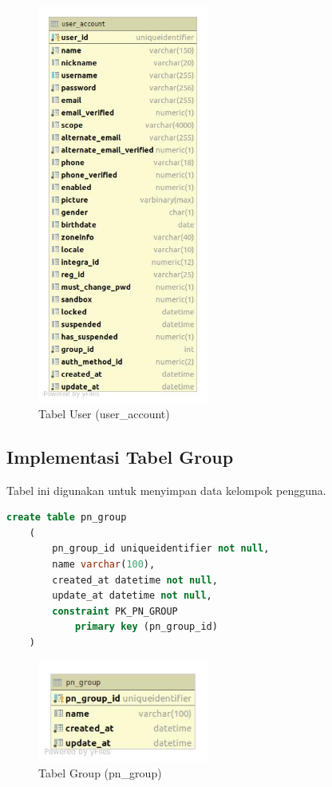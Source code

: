 \begin{figure}[H]
    \centering\includegraphics[width=0.5\textwidth]{bab4/figures/tabel_user_account.jpg}
    \caption{Tabel User (user\_account)}
    \label{tabel_user_account}
\end{figure}

\subsection{Implementasi Tabel Group}
\par Tabel ini digunakan untuk menyimpan data kelompok pengguna.
\begin{lstlisting}[language=sql, firstnumber=1, caption=Implementasi Tabel Group]
    create table pn_group
    (
        pn_group_id uniqueidentifier not null,
        name varchar(100),
        created_at datetime not null,
        update_at datetime not null,
        constraint PK_PN_GROUP
            primary key (pn_group_id)
    )
\end{lstlisting}
\begin{figure}[H]
    \centering\includegraphics[width=0.5\textwidth]{bab4/figures/tabel_pn_group.jpg}
    \caption{Tabel Group (pn\_group)}
    \label{tabel_pn_group}
\end{figure}

